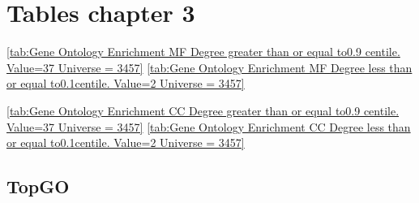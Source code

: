 \chapter{Tables chapter 3}



\ref{tab:Gene Ontology Enrichment MF Degree  greater than or equal to0.9 centile.   Value=37 Universe = 3457}
\ref{tab:Gene Ontology Enrichment MF Degree  less than or equal to0.1centile.   Value=2 Universe = 3457}

 \ref{tab:Gene Ontology Enrichment CC Degree  greater than or equal to0.9 centile.   Value=37 Universe = 3457}
    \ref{tab:Gene Ontology Enrichment CC Degree  less than or equal to0.1centile.   Value=2 Universe = 3457}

\section{TopGO}
